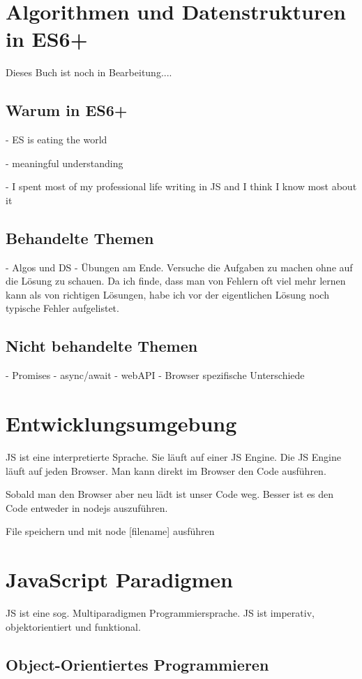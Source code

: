 \documentclass{book}
\begin{document}
\tableofcontents
\chapter{Algorithmen und Datenstrukturen in ES6+}

Dieses Buch ist noch in Bearbeitung....
\section{Warum in ES6+}
- ES is eating the world

- meaningful understanding

- I spent most of my professional life writing in JS and I think I know most about it

\section{Behandelte Themen}
- Algos und DS
- Übungen am Ende. Versuche die Aufgaben zu machen ohne auf die Lösung zu schauen. Da ich finde, dass man von Fehlern oft viel mehr lernen kann als von richtigen Lösungen, habe ich vor der eigentlichen Lösung noch typische Fehler aufgelistet.

\section{Nicht behandelte Themen}
- Promises
- async/await
- webAPI
- Browser spezifische Unterschiede

\chapter{Entwicklungsumgebung}
JS ist eine interpretierte Sprache. Sie läuft auf einer JS Engine. Die JS Engine läuft auf jeden Browser. Man kann direkt im Browser den Code ausführen.

Sobald man den Browser aber neu lädt ist unser Code weg. Besser ist es den Code entweder in nodejs auszuführen.

File speichern und mit node [filename] ausführen
\chapter{JavaScript Paradigmen}
JS ist eine sog. Multiparadigmen Programmiersprache. JS ist imperativ, objektorientiert und funktional. 
\section{Object-Orientiertes Programmieren}
\end{document}
